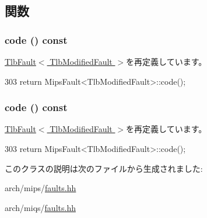 \subsection{関数}
\hypertarget{classMipsISA_1_1TlbModifiedFault_a1dd20a2460d7723d3eaa287b7cc07e79}{
\subsubsection[{code}]{ code () const}}
\label{classMipsISA_1_1TlbModifiedFault_a1dd20a2460d7723d3eaa287b7cc07e79}


\hyperlink{classMipsISA_1_1TlbFault_a1dd20a2460d7723d3eaa287b7cc07e79}{TlbFault$<$ TlbModifiedFault $>$}を再定義しています。


\begin{DoxyCode}
303 { return MipsFault<TlbModifiedFault>::code(); }
\end{DoxyCode}
\hypertarget{classMipsISA_1_1TlbModifiedFault_a1dd20a2460d7723d3eaa287b7cc07e79}{
\subsubsection[{code}]{ code () const}}
\label{classMipsISA_1_1TlbModifiedFault_a1dd20a2460d7723d3eaa287b7cc07e79}


\hyperlink{classMipsISA_1_1TlbFault_a1dd20a2460d7723d3eaa287b7cc07e79}{TlbFault$<$ TlbModifiedFault $>$}を再定義しています。


\begin{DoxyCode}
303 { return MipsFault<TlbModifiedFault>::code(); }
\end{DoxyCode}


このクラスの説明は次のファイルから生成されました:\begin{DoxyCompactItemize}
\item 
arch/mips/\hyperlink{arch_2mips_2faults_8hh}{faults.hh}\item 
arch/miqs/\hyperlink{arch_2miqs_2faults_8hh}{faults.hh}\end{DoxyCompactItemize}

